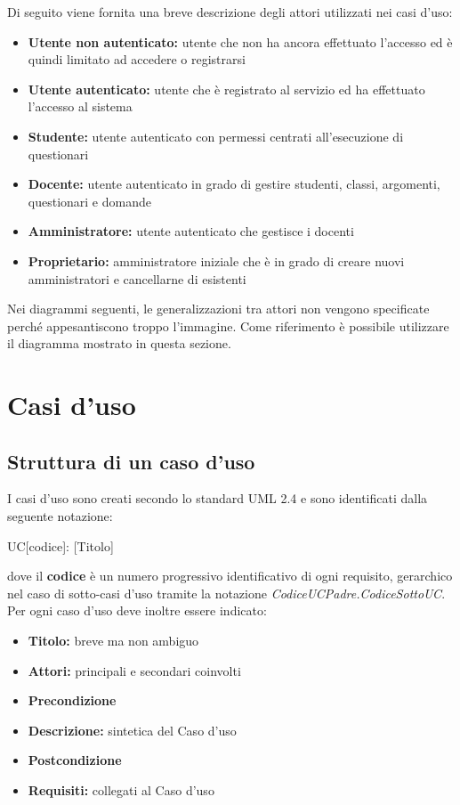 \documentclass[12pt,a4paper]{article}
\begin{document}
Di seguito viene fornita una breve descrizione degli attori utilizzati nei casi d'uso:

\begin{itemize}
    \item \textbf{Utente non autenticato:} utente che non ha ancora effettuato l'accesso ed è quindi limitato
        ad accedere o registrarsi
    \item \textbf{Utente autenticato:} utente che è registrato al servizio ed ha effettuato l'accesso al
        sistema
    \item \textbf{Studente:} utente autenticato con permessi centrati all'esecuzione di
        questionari
    \item \textbf{Docente:} utente autenticato in grado di gestire studenti, classi, argomenti, questionari
        e domande
    \item \textbf{Amministratore:} utente autenticato che gestisce i docenti
    \item \textbf{Proprietario:} amministratore iniziale che è in grado di creare nuovi amministratori
        e cancellarne di esistenti
\end{itemize}

Nei diagrammi seguenti, le generalizzazioni tra attori non vengono specificate perché
appesantiscono troppo l'immagine. Come riferimento è possibile utilizzare il diagramma mostrato in questa
sezione.

\newpage
\section{Casi d'uso}

\subsection{Struttura di un caso d'uso}
I casi d'uso sono creati secondo lo standard UML 2.4 e sono identificati dalla seguente notazione:
\begin{center}
	UC[codice]: [Titolo]
\end{center}
dove il \textbf{codice} è un numero progressivo identificativo di ogni requisito, gerarchico nel  caso di sotto-casi d'uso tramite la notazione \textit{CodiceUCPadre.CodiceSottoUC}. Per ogni caso d'uso deve inoltre essere indicato:
\begin{itemize}
	\item \textbf{Titolo:} breve ma non ambiguo
	\item \textbf{Attori:} principali e secondari coinvolti
	\item \textbf{Precondizione}
	\item \textbf{Descrizione:} sintetica del Caso d'uso
	\item \textbf{Postcondizione}
	\item \textbf{Requisiti:} collegati al Caso d'uso
\end{itemize}
\end{document}
